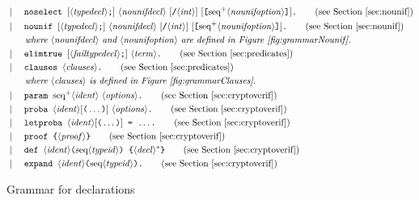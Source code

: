 \documentclass{book}
\newcommand{\nonterm}[1]{\langle\mathit{#1}\rangle}
\newcommand{\seq}[1]{\textrm{seq}\nonterm{#1}}
\newcommand{\neseq}[1]{\textrm{seq}^+\nonterm{#1}}
\begin{document}
\begin{figure}
\begin{align*}
&\mid\phantom{:=}
        \texttt{noselect } [\nonterm{typedecl}\texttt{;}]\ \nonterm{nounifdecl}\textrm{ }[\texttt{/}\nonterm{int}]\ [\texttt{[}\neseq{nounifoption}\texttt{]}]\texttt{.}\tag{see Section~\ref{sec:nounif}}\\
&\mid\phantom{:=}
        \texttt{nounif } [\nonterm{typedecl}\texttt{;}]\ \nonterm{nounifdecl}\textrm{ }[\texttt{/}\nonterm{int}]\ [\texttt{[}\neseq{nounifoption}\texttt{]}]\texttt{.}\tag{see Section~\ref{sec:nounif}}\\
&\qquad\emph{where }\nonterm{nounifdecl}\emph{ and }\nonterm{nounifoption}\emph{ are defined in Figure~\ref{fig:grammarNounif}.}\\
&\mid\phantom{:=}
        \texttt{elimtrue } [\nonterm{failtypedecl}\texttt{;}]\ \nonterm{term}\texttt{.}\tag{see Section~\ref{sec:predicates}}\\
&\mid\phantom{:=}
        \texttt{clauses } \nonterm{clauses}\texttt{.}\tag{see Section~\ref{sec:predicates}}\\
&\qquad\emph{where }\nonterm{clauses}\emph{ is defined in Figure~\ref{fig:grammarClauses}.}\\
&\mid\phantom{:=}
        \texttt{param }\neseq{ident}\ \nonterm{options}\texttt{.}\tag{see Section~\ref{sec:cryptoverif}}\\
&\mid\phantom{:=}
        \texttt{proba }\nonterm{ident}[\texttt{(}\dots\texttt{)}]\ \nonterm{options}\texttt{.}\tag{see Section~\ref{sec:cryptoverif}}\\
&\mid\phantom{:=}
        \texttt{letproba }\nonterm{ident}[\texttt{(}\dots\texttt{)}]\texttt{ = }\dots\texttt{.}\tag{see Section~\ref{sec:cryptoverif}}\\
&\mid\phantom{:=}
        \texttt{proof \{}\nonterm{proof}\texttt{\}}\tag{see Section~\ref{sec:cryptoverif}}\\
&\mid\phantom{:=}
        \texttt{def }\nonterm{ident}\texttt{(}\seq{typeid}\texttt{) \{} \nonterm{decl}^* \texttt{\}}\tag{see Section~\ref{sec:cryptoverif}}\\
&\mid\phantom{:=}
        \texttt{expand }\nonterm{ident}\texttt{(}\seq{typeid}\texttt{).}\tag{see Section~\ref{sec:cryptoverif}}
\end{align*}
\caption{Grammar for declarations}
\label{fig:grammarDeclarations}
\end{figure}

\end{document}
